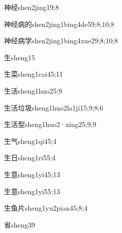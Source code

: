 \begin{verbete}{神经}{shen2jing1}{9;8}
\end{verbete}
\begin{verbete}{神经病的}{shen2jing1bing4de5}{9;8;10;8}
\end{verbete}
\begin{verbete}{神经病学}{shen2jing1bing4xue2}{9;8;10;8}
\end{verbete}
\begin{verbete}{生}{sheng1}{5}
\end{verbete}
\begin{verbete}{生菜}{sheng1cai4}{5;11}
\end{verbete}
\begin{verbete}{生活}{sheng1huo2}{5;9}
\end{verbete}
\begin{verbete}{生活垃圾}{sheng1huo2la1ji1}{5;9;8;6}
\end{verbete}
\begin{verbete}{生活型}{sheng1huo2·xing2}{5;9;9}
\end{verbete}
\begin{verbete}{生气}{sheng1qi4}{5;4}
\end{verbete}
\begin{verbete}{生日}{sheng1ri5}{5;4}
\end{verbete}
\begin{verbete}{生意}{sheng1yi4}{5;13}
\end{verbete}
\begin{verbete}{生意}{sheng1yi5}{5;13}
\end{verbete}
\begin{verbete}{生鱼片}{sheng1yu2pian4}{5;8;4}
\end{verbete}
\begin{verbete}{省}{sheng3}{9}
\end{verbete}
